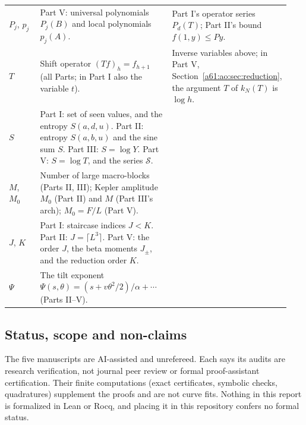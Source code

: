 \documentclass[11pt,letterpaper]{article}
\numberwithin{equation}{section}
\theoremstyle{remark}\newtheorem{remark}[theorem]{Remark}
\begin{document}
{\begin{longtable}{@{}>{\raggedright\arraybackslash}p{0.13\linewidth}>{\raggedright\arraybackslash}p{0.48\linewidth}>{\raggedright\arraybackslash}p{0.33\linewidth}@{}}
$P_j$, $p_j$ & Part V: universal polynomials $P_j(B)$ and local polynomials $p_j(A)$. & Part I's operator series $P_d(T)$; Part II's bound $f(1,y)\le Py$.\\
$T$ & Shift operator $(Tf)_h=f_{h+1}$ (all Parts; in Part I also the variable $t$). & Inverse variables above; in Part V, Section~\ref{a61:ao:sec:reduction}, the argument $T$ of $k_N(T)$ is $\log h$.\\
$S$ & Part I: set of seen values, and the entropy $S(a,d,u)$. Part II: entropy $S(a,b,u)$ and the sine sum $S$. Part III: $S=\log Y$. Part V: $S=\log T$, and the series $\mathcal S$. & \\
$M$, $M_0$ & Number of large macro-blocks (Parts II, III); Kepler amplitude $M_0$ (Part II) and $M$ (Part III's arch); $M_0=F/L$ (Part V). & \\
$J$, $K$ & Part I: staircase indices $J<K$. Part II: $J=\lceil L^3\rceil$. Part V: the order $J$, the beta moments $J_\pm$, and the reduction order $K$. & \\
$\Psi$ & The tilt exponent $\Psi(s,\theta)=(s+v\theta^2/2)/\alpha+\cdots$ (Parts II--V). & \\
\end{longtable}
}

\subsection*{Status, scope and non-claims}
\label{a61:guide:status}
The five manuscripts are AI-assisted and unrefereed. Each says its audits are research verification, not journal peer review or formal proof-assistant certification. Their finite computations (exact certificates, symbolic checks, quadratures) supplement the proofs and are not curve fits. Nothing in this report is formalized in Lean or Rocq, and placing it in this repository confers no formal status.
\end{document}
